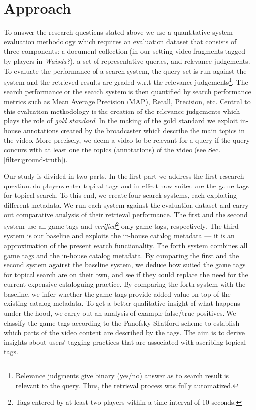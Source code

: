 \section{Approach}\label{sec:topicir-filter:approach}
To answer the research questions stated above we use a quantitative system evaluation methodology \cite{vorhees} which requires an evaluation dataset that consists of three components: a document collection (in our setting video fragments tagged by players in \textit{Waisda?}), a set of representative queries, and relevance judgements. To evaluate the performance of a search system, the query set is run against the system and the retrieved results are graded w.r.t the relevance judgements\footnote{Relevance judgments give binary (yes/no) answer as to search result is relevant to the query. Thus, the retrieval process was fully automatized.}. The search performance or the search system is then quantified by search performance metrics such as Mean Average Precision (MAP), Recall,
Precision, etc. Central to this evaluation methodology is the creation of the relevance judgements which plays the role of \textit{gold standard}. In the making of the gold standard we exploit in-house annotations created by the broadcaster which describe the main topics in the video. More precisely, we deem a video to be relevant for a query if the query concurs with at least one the topics (annotations) of the video (see Sec. \ref{filter:ground-truth}).

Our study is divided in two parts. In the first part we address the first research question: do players enter topical tags and in effect how suited are the game tags for topical search. To this end, we create four search systems, each exploiting different metadata. We run each system against the evaluation dataset and carry out comparative analysis of their retrieval performance. The first and the second system use all game tags and \textit{verified}\footnote{Tags entered by at least two players within a time interval of 10 seconds.} only game tags, respectively. The third system is our baseline and exploits the in-house catalog metadata --- it is an approximation of the present search functionality. The forth system combines all game tags and the in-house catalog metadata. By comparing the first and the second system against the baseline system, we deduce how suited the game tags for topical search are on their own, and see if they could replace the need for the current expensive cataloguing practice. By comparing the forth system with the baseline, we infer whether the game tags provide added value on top of the existing catalog metadata. 
To get a better qualitative insight of what happens under the hood, we carry out an analysis of example false/true positives. We classify the game tags according to the Panofsky-Shatford scheme \cite{laurapaper} to establish which parts of the video content are described by the tags. The aim is to derive insights about users' tagging practices that are associated with ascribing topical tags. 

